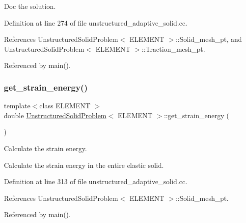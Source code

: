Doc the solution. 



Definition at line 274 of file unstructured\+\_\+adaptive\+\_\+solid.\+cc.



References Unstructured\+Solid\+Problem$<$ E\+L\+E\+M\+E\+N\+T $>$\+::\+Solid\+\_\+mesh\+\_\+pt, and Unstructured\+Solid\+Problem$<$ E\+L\+E\+M\+E\+N\+T $>$\+::\+Traction\+\_\+mesh\+\_\+pt.



Referenced by main().

\mbox{\label{classUnstructuredSolidProblem_a4da918a1f0cf94ebccc5112b58c28ece}} 
\subsubsection{\texorpdfstring{get\+\_\+strain\+\_\+energy()}{get\_strain\_energy()}}
{\footnotesize\ttfamily template$<$class E\+L\+E\+M\+E\+NT $>$ \\
double \hyperlink{classUnstructuredSolidProblem}{Unstructured\+Solid\+Problem}$<$ E\+L\+E\+M\+E\+NT $>$\+::get\+\_\+strain\+\_\+energy (\begin{DoxyParamCaption}{ }\end{DoxyParamCaption})}



Calculate the strain energy. 

Calculate the strain energy in the entire elastic solid. 

Definition at line 313 of file unstructured\+\_\+adaptive\+\_\+solid.\+cc.



References Unstructured\+Solid\+Problem$<$ E\+L\+E\+M\+E\+N\+T $>$\+::\+Solid\+\_\+mesh\+\_\+pt.



Referenced by main().

\mbox{\label{classUnstructuredSolidProblem_a9b725d83bc051b594d080a40d6d317d3}} 
